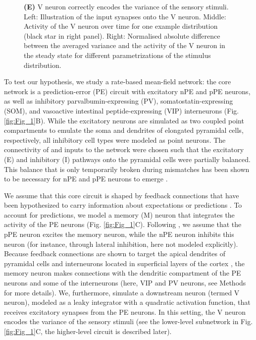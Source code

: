 \documentclass[10pt,a4paper]{article}
\begin{document}
\begin{figure}[t!]
{{\bf (E)} V neuron correctly encodes the variance of the sensory stimuli. Left: Illustration of the input synapses onto the V neuron. Middle: Activity of the V neuron over time for one example distribution (black star in right panel). Right: Normalised absolute difference between the averaged variance and the activity of the V neuron in the steady state for different parametrizations of the stimulus distribution.
}
\label{fig:Fig_2}
\end{figure}
%

To test our hypothesis, we study a rate-based mean-field network: the core network is a prediction-error (PE) circuit with excitatory nPE and pPE neurons, as well as inhibitory parvalbumin-expressing (PV), somatostatin-expressing (SOM), and vasoactive intestinal peptide-expressing (VIP) interneurons (Fig. \ref{fig:Fig_1}B). While the excitatory neurons are simulated as two coupled point compartments to emulate the soma and dendrites of elongated pyramidal cells, respectively, all inhibitory cell types were modeled as point neurons. The connectivity of and inputs to the network were chosen such that the excitatory (E) and inhibitory (I) pathways onto the pyramidal cells were partially balanced. This balance that is only temporarily broken during mismatches has been shown to be necessary for nPE and pPE neurons to emerge \citep[][see Methods]{hertag2020learning, hertag2022prediction}. 

We assume that this core circuit is shaped by feedback connections \citep{larkum2013cellular, harris2015neocortical} that have been hypothesized to carry information about expectations or predictions \citep{mumford1992computational, larkum2013cellular, friston2008hierarchical}. To account for predictions, we model a memory (M) neuron that integrates the activity of the PE neurons (Fig. \ref{fig:Fig_1}C). Following \cite{keller2018predictive}, we assume that the pPE neuron excites the memory neuron, while the nPE neuron inhibits this neuron (for instance, through lateral inhibition, here not modeled explicitly). Because feedback connections are shown to target the apical dendrites of pyramidal cells \citep{larkum2013cellular} and interneurons located in superficial layers of the cortex \citep[see, e.g.][]{tremblay2016gabaergic}, the memory neuron makes connections with the dendritic compartment of the PE neurons and some of the interneurons (here, VIP and PV neurons, see Methods for more details). We, furthermore, simulate a downstream neuron (termed V neuron), modeled as a leaky integrator with a quadratic activation function, that receives excitatory synapses from the PE neurons. In this setting, the V neuron encodes the variance of the sensory stimuli (see the lower-level subnetwork in Fig. \ref{fig:Fig_1}C, the higher-level circuit is described later). 
\end{document}
